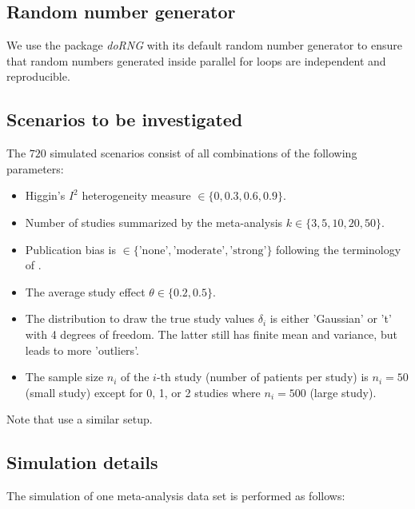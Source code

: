 \documentclass[letterpaper, 12pt]{article}
\newcommand{\pkg}[1]{\textit{#1}}
\begin{document}
\subsection{Random number generator}
We use the package \pkg{doRNG} with its default random number generator to
ensure that random numbers generated inside parallel for loops are independent
and reproducible.


\subsection{Scenarios to be investigated} \label{sec:scenario}
The $720$ simulated scenarios consist of all combinations
of the following parameters:
\begin{itemize}
\item Higgin's $I^2$ heterogeneity measure $\in \{0, 0.3, 0.6, 0.9\}$.
\item Number of studies summarized by the meta-analysis $k \in \{3, 5, 10, 20, 50\}$.
\item Publication bias is  $\in \{\text{'none'}, \text{'moderate'}, \text{'strong'}\}$
  following the terminology of \citet{henm:copa:10}. 
\item The average study effect $\theta \in \{0.2, 0.5\}$. 
\item The distribution to draw the true study values $\delta_i$ is either
  'Gaussian' or 't' with 4 degrees of freedom. The latter still has finite mean
    and variance, but leads to more 'outliers'.
\item The sample size $n_i$ of the $i$-th study (number of patients per study)
  is $n_i = 50$ (small study) except for 0, 1, or 2 studies where
  $n_i=500$ (large study). 
\end{itemize}

Note that \citet{IntHoutIoannidis} use a similar setup.

\subsection{Simulation details}

The simulation of one meta-analysis data set is performed as follows:
\end{document}
